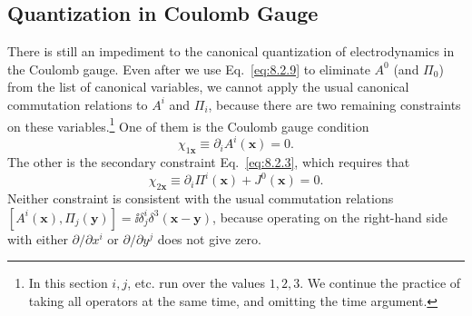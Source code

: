 
\subsection{Quantization in Coulomb Gauge}

There is still an impediment to the canonical quantization of
electrodynamics in the Coulomb gauge. Even after we use Eq.~\eqref{eq:8.2.9} to
eliminate $A^0$ (and $\Pi_0$) from the list of canonical variables, we cannot
apply the usual canonical commutation relations to $A^i$ and $\Pi_i$, because
there are two remaining constraints on these variables.\footnote{In this
section $i,j$, etc. run over the values $1,2,3$. We continue the practice of
taking all operators at the same time, and omitting the time argument.} One
of them is the Coulomb gauge condition
\begin{equation}
  \chi_{1\mathbf x}\equiv\partial_iA^i(\mathbf x)=0.
  \tag{8.3.1}\label{eq:8.3.1}
\end{equation}
The other is the secondary constraint Eq.~\eqref{eq:8.2.3}, which requires that
\begin{equation}
  \chi_{2\mathbf x}\equiv\partial_i\Pi^i(\mathbf x)+J^0(\mathbf x)=0.
  \tag{8.3.2}\label{eq:8.3.2}
\end{equation}
Neither constraint is consistent with the usual commutation relations
$[A^i(\mathbf x),\Pi_j(\mathbf y)]=\ii\delta^i_j\delta^3(\mathbf x-\mathbf y)$,
because operating on the right-hand side with either $\partial/\partial x^i$
or $\partial/\partial y^j$ does not give zero.

